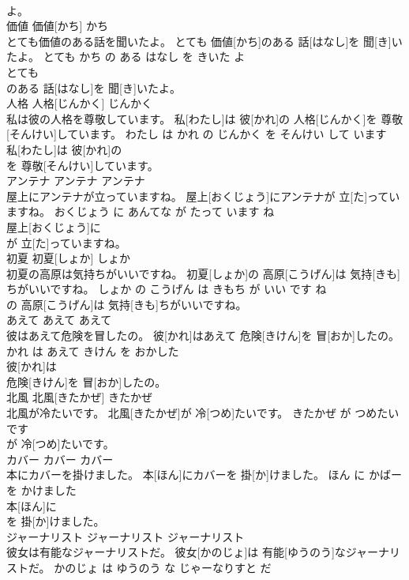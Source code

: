 \documentclass[8pt]{extreport}
\begin{document}
\begin{CJK}{UTF8}{min}
\\	よ。			
\\	価値	価値[かち]	かち	
\\	とても価値のある話を聞いたよ。	とても 価値[かち]のある 話[はなし]を 聞[き]いたよ。	とても かち の ある はなし を きいた よ	
\\	とても
\\	のある 話[はなし]を 聞[き]いたよ。			
\\	人格	人格[じんかく]	じんかく	
\\	私は彼の人格を尊敬しています。	私[わたし]は 彼[かれ]の 人格[じんかく]を 尊敬[そんけい]しています。	わたし は かれ の じんかく を そんけい して います	
\\	私[わたし]は 彼[かれ]の
\\	を 尊敬[そんけい]しています。			
\\	アンテナ	アンテナ	アンテナ	
\\	屋上にアンテナが立っていますね。	屋上[おくじょう]にアンテナが 立[た]っていますね。	おくじょう に あんてな が たって います ね	
\\	屋上[おくじょう]に
\\	が 立[た]っていますね。			
\\	初夏	初夏[しょか]	しょか	
\\	初夏の高原は気持ちがいいですね。	初夏[しょか]の 高原[こうげん]は 気持[きも]ちがいいですね。	しょか の こうげん は きもち が いい です ね	
\\	の 高原[こうげん]は 気持[きも]ちがいいですね。			
\\	あえて	あえて	あえて	
\\	彼はあえて危険を冒したの。	彼[かれ]はあえて 危険[きけん]を 冒[おか]したの。	かれ は あえて きけん を おかした	
\\	彼[かれ]は
\\	危険[きけん]を 冒[おか]したの。			
\\	北風	北風[きたかぜ]	きたかぜ	
\\	北風が冷たいです。	北風[きたかぜ]が 冷[つめ]たいです。	きたかぜ が つめたい です	
\\	が 冷[つめ]たいです。			
\\	カバー	カバー	カバー	
\\	本にカバーを掛けました。	本[ほん]にカバーを 掛[か]けました。	ほん に かばー を かけました	
\\	本[ほん]に
\\	を 掛[か]けました。			
\\	ジャーナリスト	ジャーナリスト	ジャーナリスト	
\\	彼女は有能なジャーナリストだ。	彼女[かのじょ]は 有能[ゆうのう]なジャーナリストだ。	かのじょ は ゆうのう な じゃーなりすと だ	

\end{CJK}
\end{document}
